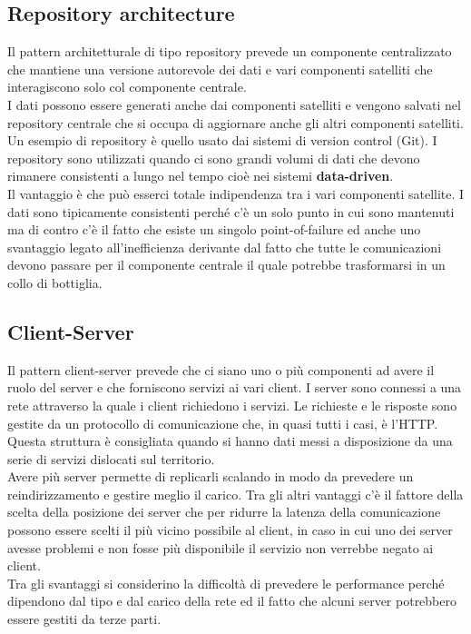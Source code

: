 \subsection{Repository architecture}
Il pattern architetturale di tipo repository prevede un componente centralizzato che mantiene una versione autorevole dei dati e vari componenti satelliti che interagiscono solo col componente centrale.\\
I dati possono essere generati anche dai componenti satelliti e vengono salvati nel repository centrale che si occupa di aggiornare anche gli altri componenti satelliti.
Un esempio di repository è quello usato dai sistemi di version control (Git).
I repository sono utilizzati quando ci sono grandi volumi di dati che devono rimanere consistenti a lungo nel tempo cioè nei sistemi \textbf{data-driven}.\\
Il vantaggio è che può esserci totale indipendenza tra i vari componenti satellite. 
I dati sono tipicamente consistenti perché c'è un solo punto in cui sono mantenuti ma di contro c'è il fatto che esiste un singolo point-of-failure ed anche uno svantaggio legato all'inefficienza derivante dal fatto che tutte le comunicazioni devono passare per il componente centrale il quale potrebbe trasformarsi in un collo di bottiglia.

\subsection{Client-Server}
Il pattern client-server prevede che ci siano uno o più componenti ad avere il ruolo del server e che forniscono servizi ai vari client.
I server sono connessi a una rete attraverso la quale i client richiedono i servizi.
Le richieste e le risposte sono gestite da un protocollo di comunicazione che, in quasi tutti i casi, è l'\acrfull{HTTP}.\\
Questa struttura è consigliata quando si hanno dati messi a disposizione da una serie di servizi dislocati sul territorio.\\
Avere più server permette di replicarli scalando in modo da prevedere un reindirizzamento e gestire meglio il carico.
Tra gli altri vantaggi c'è il fattore della scelta della posizione dei server che per ridurre la latenza della comunicazione possono essere scelti il più vicino possibile al client, in caso in cui uno dei server avesse problemi e non fosse più disponibile il servizio non verrebbe negato ai client.\\
Tra gli svantaggi si considerino la difficoltà di prevedere le performance perché dipendono dal tipo e dal carico della rete ed il fatto che alcuni server potrebbero essere gestiti da terze parti.

